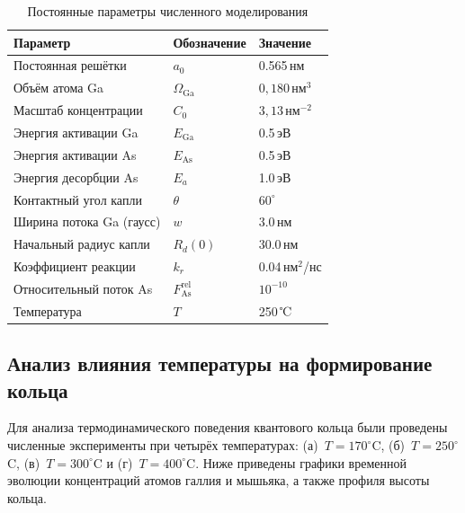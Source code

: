 \documentclass[14pt,oneside]{extarticle}
\begin{document}
\begin{table}[H]
    \centering
    \caption{Постоянные параметры численного моделирования}
    \label{tab:params-fixed}
    \begin{tabular}{|l|l|l|}
    \hline
    \textbf{Параметр} & \textbf{Обозначение} & \textbf{Значение} \\ \hline
    Постоянная решётки & $a_0$ & 0.565\,нм \\ \hline
    Объём атома Ga & $\Omega_{\text{Ga}}$ &  $0{,}180\,\text{нм}^3$ \\ \hline
    Масштаб концентрации & $C_0$ & $ 3{,}13\,\text{нм}^{-2}$ \\ \hline
    Энергия активации Ga & $E_{\text{Ga}}$ & 0.5\,эВ \\ \hline
    Энергия активации As & $E_{\text{As}}$ & 0.5\,эВ \\ \hline
    Энергия десорбции As & $E_a$ & 1.0\,эВ \\ \hline
    Контактный угол капли & $\theta$ & $60^\circ$ \\ \hline
    Ширина потока Ga (гаусс) & $w$ & 3.0\,нм \\ \hline
    Начальный радиус капли & $R_d(0)$ & 30.0\,нм \\ \hline
    Коэффициент реакции & $k_r$ & 0.04\,нм$^2$/нс \\ \hline
    Относительный поток As & $F_{\text{As}}^{\text{rel}}$ & $10^{-10}$ \\ \hline
    Температура & $T$ & 250\,℃ \\ \hline
    \end{tabular}
\end{table}    

\subsection{Анализ влияния температуры на формирование кольца}

Для анализа термодинамического поведения квантового кольца были проведены численные эксперименты при четырёх температурах: (а)~$T = 170^\circ$C, (б)~$T = 250^\circ$C, (в)~$T = 300^\circ$C и (г)~$T = 400^\circ$C. Ниже приведены графики временной эволюции концентраций атомов галлия и мышьяка, а также профиля высоты кольца.    
\end{document}
